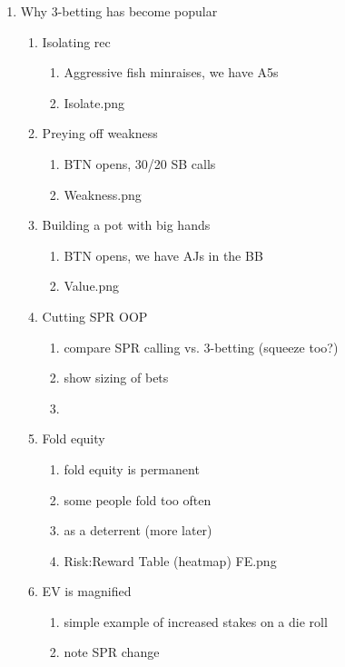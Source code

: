 \documentclass[11pt]{article}
\begin{document}
\begin{enumerate}
\item Why 3-betting has become popular
\begin{enumerate}
\item Isolating rec
	\begin{enumerate}
	\item Aggressive fish minraises, we have A5s
	\item Isolate.png
	\end{enumerate}
\item Preying off weakness
	\begin{enumerate}
	\item BTN opens, 30/20 SB calls
	\item Weakness.png
	\end{enumerate}

\item Building a pot with big hands
	\begin{enumerate}
	\item BTN opens, we have AJs in the BB
	\item Value.png
	\end{enumerate}
\item Cutting SPR OOP
	\begin{enumerate}
	\item compare SPR calling vs. 3-betting (squeeze too?)
	\item show sizing of bets
	\item %
	\end{enumerate}
	
\item Fold equity
	\begin{enumerate}
	\item fold equity is permanent
	\item some people fold too often
	\item as a deterrent (more later)
	\item Risk:Reward Table (heatmap) FE.png
	\end{enumerate}
\item EV is magnified
	\begin{enumerate}
	\item simple example of increased stakes on a die roll
	\item note SPR change
	\end{enumerate}
\end{enumerate}
\end{enumerate}
\end{document}
